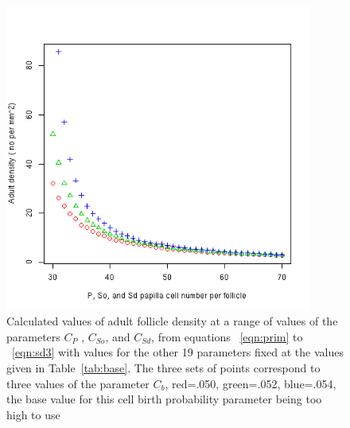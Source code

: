 %

\begin{figure}[!h]
  \centering
   \includegraphics[width=0.9\textwidth]{avecellnodens.png}
  \caption{Calculated values of adult follicle density at a range of values of the parameters $C_{P}$ , $C_{So}$, and $C_{Sd}$,  from equations ~\ref{eqn:prim} to ~\ref{eqn:sd3} with values for the other 19  parameters fixed at the values given in Table~\ref{tab:base}. The three sets of points correspond to three values of the parameter $C_{b}$, red=.050, green=.052, blue=.054, the base value for this cell birth probability parameter being too high to use}
  \label{fig:avecellnodens}
\end{figure}

%

